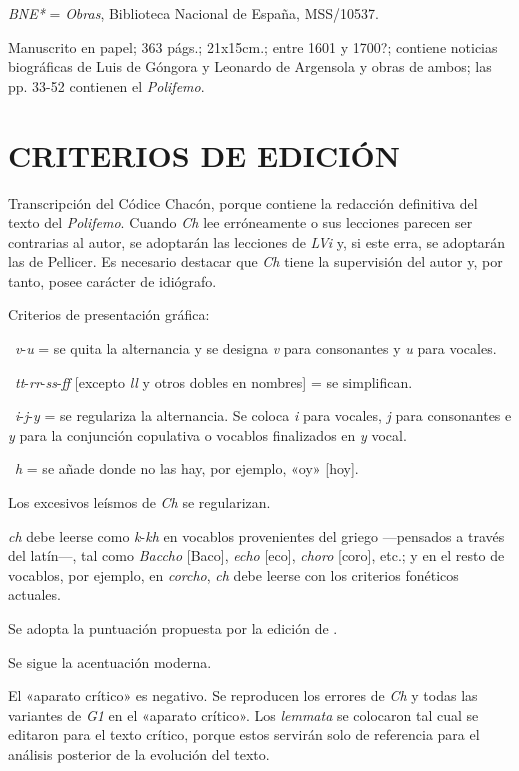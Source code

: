 \documentclass[11pt,a4paper,twoside]{article}
\newcommand{\comillas}[1]{«#1»}
\begin{document}
\textit{BNE*} = \textit{Obras}, Biblioteca Nacional de España, MSS/10537. 

Manuscrito en papel; 363 págs.; 21x15cm.; entre 1601 y 1700?; contiene noticias biográficas de Luis de Góngora y Leonardo de Argensola y obras de ambos; las pp. 33-52 contienen el \textit{Polifemo}.

\section*{\fontsize{13}{14.35}\selectfont CRITERIOS DE EDICIÓN}

Transcripción del Códice Chacón, porque contiene la redacción definitiva del texto del \textit{Polifemo}. Cuando \textit{Ch} lee erróneamente o sus lecciones parecen ser contrarias al autor, se adoptarán las lecciones de \textit{LVi} y, si este erra, se adoptarán las de Pellicer. Es necesario destacar que \textit{Ch} tiene la supervisión del autor y, por tanto, posee carácter de idiógrafo. 

Criterios de presentación gráfica: 

~\textit{v}-\textit{u} = se quita la alternancia y se designa \textit{v} para consonantes y \textit{u} para vocales.

~\textit{tt}-\textit{rr}-\textit{ss}-\textit{ff} [excepto \textit{ll} y otros dobles en nombres] = se simplifican.

~\textit{i}-\textit{j}-\textit{y} = se regulariza la alternancia. Se coloca \textit{i} para vocales, \textit{j }para consonantes e \textit{y} para la conjunción copulativa o vocablos finalizados en \textit{y} vocal.

~\textit{h} = se añade donde no las hay, por ejemplo, «oy» [hoy].

Los excesivos leísmos de \textit{Ch} se regularizan.

\textit{ch} debe leerse como \textit{k}-\textit{kh} en vocablos provenientes del griego —pensados a través del latín—, tal como \textit{Baccho} [Baco], \textit{echo} [eco], \textit{choro} [coro], etc.; y en el resto de vocablos, por ejemplo, en \textit{corcho}, \textit{ch} debe leerse con los criterios fonéticos actuales.

Se adopta la puntuación propuesta por la edición de \textcite{Alonso1967}.

Se sigue la acentuación moderna.

El \comillas{aparato crítico} es negativo. Se reproducen los errores de \textit{Ch} y todas las variantes de \textit{G1} en el \comillas{aparato crítico}. Los \textit{lemmata} se colocaron tal cual se editaron para el texto crítico, porque estos servirán solo de referencia para el análisis posterior de la evolución del texto. 
\end{document}
